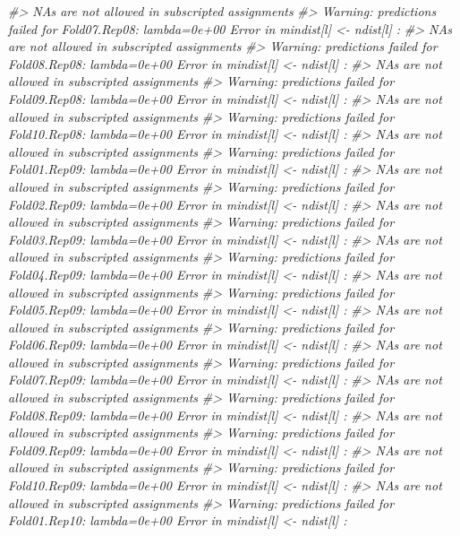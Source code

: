 \documentclass[]{book}
\newenvironment{Shaded}{\begin{snugshade}}{\end{snugshade}}
\newcommand{\CommentTok}[1]{\textcolor[rgb]{0.56,0.35,0.01}{\textit{#1}}}
\begin{document}
\begin{Shaded}
\begin{Highlighting}[]
\CommentTok{#>   NAs are not allowed in subscripted assignments}
\CommentTok{#> Warning: predictions failed for Fold07.Rep08: lambda=0e+00 Error in mindist[l] <- ndist[l] : }
\CommentTok{#>   NAs are not allowed in subscripted assignments}
\CommentTok{#> Warning: predictions failed for Fold08.Rep08: lambda=0e+00 Error in mindist[l] <- ndist[l] : }
\CommentTok{#>   NAs are not allowed in subscripted assignments}
\CommentTok{#> Warning: predictions failed for Fold09.Rep08: lambda=0e+00 Error in mindist[l] <- ndist[l] : }
\CommentTok{#>   NAs are not allowed in subscripted assignments}
\CommentTok{#> Warning: predictions failed for Fold10.Rep08: lambda=0e+00 Error in mindist[l] <- ndist[l] : }
\CommentTok{#>   NAs are not allowed in subscripted assignments}
\CommentTok{#> Warning: predictions failed for Fold01.Rep09: lambda=0e+00 Error in mindist[l] <- ndist[l] : }
\CommentTok{#>   NAs are not allowed in subscripted assignments}
\CommentTok{#> Warning: predictions failed for Fold02.Rep09: lambda=0e+00 Error in mindist[l] <- ndist[l] : }
\CommentTok{#>   NAs are not allowed in subscripted assignments}
\CommentTok{#> Warning: predictions failed for Fold03.Rep09: lambda=0e+00 Error in mindist[l] <- ndist[l] : }
\CommentTok{#>   NAs are not allowed in subscripted assignments}
\CommentTok{#> Warning: predictions failed for Fold04.Rep09: lambda=0e+00 Error in mindist[l] <- ndist[l] : }
\CommentTok{#>   NAs are not allowed in subscripted assignments}
\CommentTok{#> Warning: predictions failed for Fold05.Rep09: lambda=0e+00 Error in mindist[l] <- ndist[l] : }
\CommentTok{#>   NAs are not allowed in subscripted assignments}
\CommentTok{#> Warning: predictions failed for Fold06.Rep09: lambda=0e+00 Error in mindist[l] <- ndist[l] : }
\CommentTok{#>   NAs are not allowed in subscripted assignments}
\CommentTok{#> Warning: predictions failed for Fold07.Rep09: lambda=0e+00 Error in mindist[l] <- ndist[l] : }
\CommentTok{#>   NAs are not allowed in subscripted assignments}
\CommentTok{#> Warning: predictions failed for Fold08.Rep09: lambda=0e+00 Error in mindist[l] <- ndist[l] : }
\CommentTok{#>   NAs are not allowed in subscripted assignments}
\CommentTok{#> Warning: predictions failed for Fold09.Rep09: lambda=0e+00 Error in mindist[l] <- ndist[l] : }
\CommentTok{#>   NAs are not allowed in subscripted assignments}
\CommentTok{#> Warning: predictions failed for Fold10.Rep09: lambda=0e+00 Error in mindist[l] <- ndist[l] : }
\CommentTok{#>   NAs are not allowed in subscripted assignments}
\CommentTok{#> Warning: predictions failed for Fold01.Rep10: lambda=0e+00 Error in mindist[l] <- ndist[l] : }

\end{Highlighting}
\end{Shaded}
\end{document}
